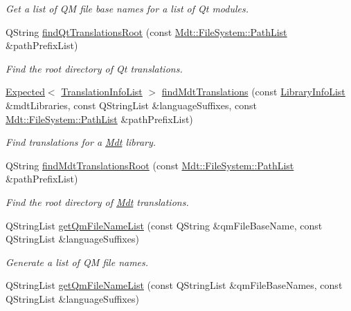\begin{DoxyCompactItemize}
\begin{DoxyCompactList}\small\item\em Get a list of QM file base names for a list of Qt modules. \end{DoxyCompactList}\item 
Q\+String \hyperlink{namespace_mdt_1_1_deploy_utils_af941377def14830db03d002eb318dcbd}{find\+Qt\+Translations\+Root} (const \hyperlink{class_mdt_1_1_file_system_1_1_path_list}{Mdt\+::\+File\+System\+::\+Path\+List} \&path\+Prefix\+List)
\begin{DoxyCompactList}\small\item\em Find the root directory of Qt translations. \end{DoxyCompactList}\item 
\hyperlink{class_mdt_1_1_expected}{Expected}$<$ \hyperlink{class_mdt_1_1_translation_1_1_translation_info_list}{Translation\+Info\+List} $>$ \hyperlink{namespace_mdt_1_1_deploy_utils_ad057d0129cbedf6a9d27c1ccf238640c}{find\+Mdt\+Translations} (const \hyperlink{class_mdt_1_1_deploy_utils_1_1_library_info_list}{Library\+Info\+List} \&mdt\+Libraries, const Q\+String\+List \&language\+Suffixes, const \hyperlink{class_mdt_1_1_file_system_1_1_path_list}{Mdt\+::\+File\+System\+::\+Path\+List} \&path\+Prefix\+List)
\begin{DoxyCompactList}\small\item\em Find translations for a \hyperlink{namespace_mdt}{Mdt} library. \end{DoxyCompactList}\item 
Q\+String \hyperlink{namespace_mdt_1_1_deploy_utils_ab2b5152d5460198443db2fd25dda0249}{find\+Mdt\+Translations\+Root} (const \hyperlink{class_mdt_1_1_file_system_1_1_path_list}{Mdt\+::\+File\+System\+::\+Path\+List} \&path\+Prefix\+List)
\begin{DoxyCompactList}\small\item\em Find the root directory of \hyperlink{namespace_mdt}{Mdt} translations. \end{DoxyCompactList}\item 
Q\+String\+List \hyperlink{namespace_mdt_1_1_deploy_utils_aeb3d48d3f2a95947a20b0b24a52abff2}{get\+Qm\+File\+Name\+List} (const Q\+String \&qm\+File\+Base\+Name, const Q\+String\+List \&language\+Suffixes)\hypertarget{namespace_mdt_1_1_deploy_utils_aeb3d48d3f2a95947a20b0b24a52abff2}{}\label{namespace_mdt_1_1_deploy_utils_aeb3d48d3f2a95947a20b0b24a52abff2}

\begin{DoxyCompactList}\small\item\em Generate a list of QM file names. \end{DoxyCompactList}\item 
Q\+String\+List \hyperlink{namespace_mdt_1_1_deploy_utils_a00fb23ac8ff45594576975c15a2b5b76}{get\+Qm\+File\+Name\+List} (const Q\+String\+List \&qm\+File\+Base\+Names, const Q\+String\+List \&language\+Suffixes)\hypertarget{namespace_mdt_1_1_deploy_utils_a00fb23ac8ff45594576975c15a2b5b76}{}\label{namespace_mdt_1_1_deploy_utils_a00fb23ac8ff45594576975c15a2b5b76}


\end{DoxyCompactItemize}
